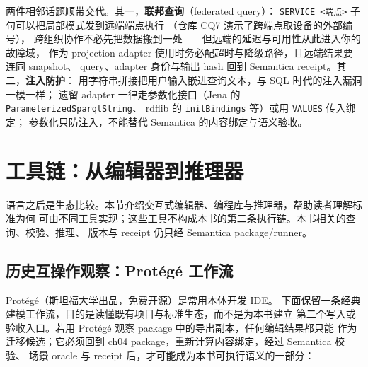 两件相邻话题顺带交代。其一，\textbf{联邦查询}（federated query）：
\texttt{SERVICE <端点>} 子句可以把局部模式发到远端端点执行
（仓库 CQ7 演示了跨端点取设备的外部编号），
跨组织协作不必先把数据搬到一处——但远端的延迟与可用性从此进入你的故障域，
作为 projection adapter 使用时务必配超时与降级路径，且远端结果要连同 snapshot、
query、adapter 身份与输出 hash 回到 Semantica receipt。其二，\textbf{注入防护}：
用字符串拼接把用户输入嵌进查询文本，与 SQL 时代的注入漏洞一模一样；
遗留 adapter 一律走参数化接口（Jena 的 \texttt{ParameterizedSparqlString}、
rdflib 的 \texttt{initBindings} 等）或用 \texttt{VALUES} 传入绑定；
参数化只防注入，不能替代 Semantica 的内容绑定与语义验收。

\section{工具链：从编辑器到推理器}

语言之后是生态比较。本节介绍交互式编辑器、编程库与推理器，帮助读者理解标准为何
可由不同工具实现；这些工具不构成本书的第二条执行链。本书相关的查询、校验、推理、
版本与 receipt 仍只经 Semantica package/runner。

\subsection{历史互操作观察：Protégé 工作流}

Protégé（斯坦福大学出品，免费开源）是常用本体开发 IDE。
下面保留一条经典建模工作流，目的是读懂既有项目与标准生态，而不是为本书建立
第二个写入或验收入口。若用 Protégé 观察 package 中的导出副本，任何编辑结果都只能
作为迁移候选；它必须回到 ch04 package，重新计算内容绑定，经过 Semantica 校验、
场景 oracle 与 receipt 后，才可能成为本书可执行语义的一部分：

